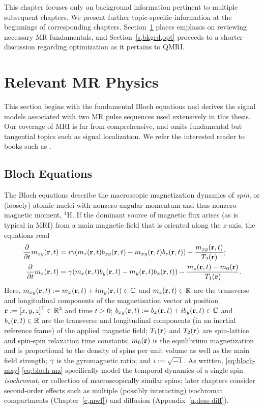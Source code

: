 
This chapter focuses
only on background information 
pertinent to multiple subsequent chapters.
We present further topic-specific information 
at the beginnings 
of corresponding chapters.
Section~\ref{s,bkgrd,mri} places emphasis
on reviewing necessary MR fundamentals,
and Section~\ref{s,bkgrd,opt}
proceeds to a shorter discussion
regarding optimization
as it pertains to QMRI.

\section{Relevant MR Physics}
\label{s,bkgrd,mri}

This section begins
with the fundamental Bloch equations
and derives the signal models
associated with 
two MR pulse sequences
used extensively in this thesis.
Our coverage of MRI
is far from comprehensive, 
and omits fundamental but tangential topics
such as signal localization.
We refer the interested reader
to books such as 
\cite{macovski:83,haacke:99,nishimura:96:pom}.

\subsection{Bloch Equations}
\label{ss,bkgrd,mri,bloch}

The Bloch equations
\cite{bloch:1946:ni-paper}
describe the macroscopic magnetization dynamics
of \emph{spin}, 
or (loosely) atomic nuclei with nonzero 
angular momentum
and thus nonzero magnetic moment,
\eg $^1$H.
If the dominant source
of magnetic flux 
arises 
(as is typical in MRI)
from a main magnetic field
that is oriented along the $z$-axis,
the equations read
\begin{align}
	\dela{t} \mxy\prt &= i\gam\paren{\mz\prt \bxy\prt - \mxy\prt \bz\prt} -
		\frac{\mxy\prt}{\Tt\pr} ;
		\label{eq:bloch-mxy} \\
	\dela{t} \mz\prt &= \gam\paren{\mx\prt \by\prt - \my\prt \bx\prt} - 
		\frac{\mz\prt - \mzero\pr}{\To\pr}.
		\label{eq:bloch-mz}
\end{align}
Here, 
$\mxy\prt := \mx\prt + i\my\prt \in \complex$
and
$\mz\prt \in \real$
are the transverse and longitudinal components 
of the magnetization vector
at position $\mathbf{r} := [x, y, z]^{\mathsf{T}} \in \mathbb{R}^{3}$ 
and time $t\geq0$;
$\bxy\prt := \bx\prt + i\by\prt \in \complex$
and 
$\bz\prt \in \real$
are the transverse and longitudinal components 
(in an inertial reference frame)
of the applied magnetic field;
$\To\pr$ and $\Tt\pr$
are spin-lattice and spin-spin relaxation time constants;
$\mzero\pr$ 
is the equilibrium magnetization
and is proportional to the density
of spins per unit volume
as well as the main field strength;
$\gamma$
is the gyromagnetic ratio;
and $i := \sqrt{-1}$.
As written,
\eqref{eq:bloch-mxy}-\eqref{eq:bloch-mz}
specifically model the temporal dynamics
of a single spin \emph{isochromat}, 
or collection of macroscopically similar spins;
later chapters consider second-order effects
such as multiple (possibly interacting) isochromat compartments
(Chapter~\ref{c,mwf})
and diffusion
(Appendix~\ref{a,dess-diff}).

